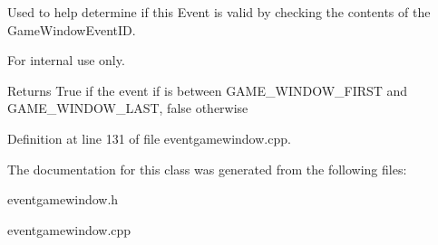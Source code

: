 Used to help determine if this Event is valid by checking the contents of the GameWindowEventID. 

\begin{DoxyInternal}{For internal use only.}
\begin{DoxyReturn}{Returns}
True if the event if is between GAME\_\-WINDOW\_\-FIRST and GAME\_\-WINDOW\_\-LAST, false otherwise 
\end{DoxyReturn}
\end{DoxyInternal}


Definition at line 131 of file eventgamewindow.cpp.



The documentation for this class was generated from the following files:\begin{DoxyCompactItemize}
\item 
eventgamewindow.h\item 
eventgamewindow.cpp\end{DoxyCompactItemize}
